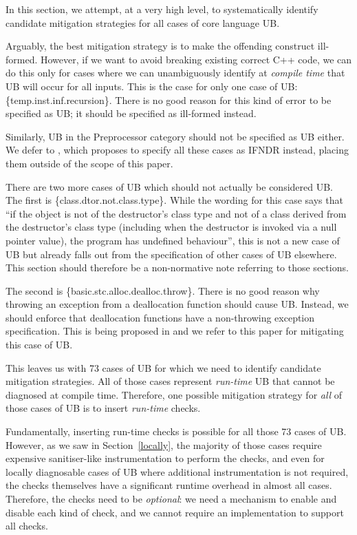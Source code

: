 In this section, we attempt, at a very high level, to systematically identify candidate mitigation strategies for all cases of core language UB.

Arguably, the best mitigation strategy is to make the offending construct ill-formed. However, if we want to avoid breaking existing correct C++ code, we can do this only for cases where we can unambiguously identify at \emph{compile time} that UB will occur for all inputs. This is the case for only one case of UB: 
\{temp.inst.inf.recursion\}. There is no good reason for this kind of error to be specified as UB; it should be specified as ill-formed instead.

Similarly, UB in the Preprocessor category should not be specified as UB either. We defer to \cite{P2843R2}, which proposes to specify all these cases as IFNDR instead, placing them outside of the scope of this paper.

There are two more cases of UB which should not actually be considered UB. The first is \{class.dtor.not.class.type\}. While the wording for this case says that ``if the object is not of the destructor's class type and not of a class derived from the destructor's class type (including when the destructor is invoked via a null pointer value), the program has undefined behaviour'', this is not a new case of UB but already falls out from the specification of other cases of UB elsewhere. This section should therefore be a non-normative note referring to those sections.

The second is \{basic.stc.alloc.dealloc.throw\}. There is no good reason why throwing an exception from a deallocation function should cause UB. Instead, we should enforce that deallocation functions have a non-throwing exception specification. This is being proposed in \cite{P3424R0} and we refer to this paper for mitigating this case of UB.

This leaves us with 73 cases of UB for which we need to identify candidate mitigation strategies. All of those cases represent \emph{run-time} UB that cannot be diagnosed at compile time. Therefore, one possible mitigation strategy for \emph{all} of those cases of UB is to insert \emph{run-time} checks.

Fundamentally, inserting run-time checks is possible for all those 73 cases of UB. However, as we saw in Section~\ref{locally}, the majority of those cases require expensive sanitiser-like instrumentation to perform the checks, and even for locally diagnosable cases of UB where additional instrumentation is not required, the checks themselves have a significant runtime overhead in almost all cases. Therefore, the checks need to be \emph{optional}: we need a mechanism to enable and disable each kind of check, and we cannot require an implementation to support all checks.

